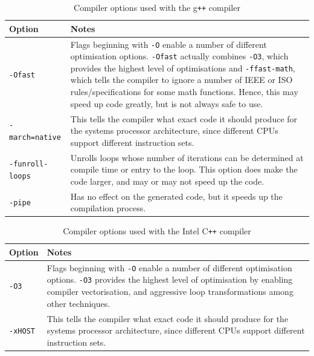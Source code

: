 \documentclass[ %
                    author={Manan Vaswani},
                supervisor={Dr. Raphael Clifford},
                    degree={MEng},
                     title={A multi-core CPU implementation of the classical Boson Sampling algorithm},
                  subtitle={},
                      type={},
                      year={2019} ]{dissertation}
\theoremstyle{plain}
\theoremstyle{definition}
\begin{document}
\begin{table}[h!]
\centering
	\begin{tabular}{ |p{} | p{} |}
    	\hline
	\textbf{Option} & \textbf{Notes} \\
   	\hline
	\texttt{-Ofast} & Flags beginning with \texttt{-O} enable a number of different optimisation options. \texttt{-Ofast} actually combines  \texttt{-O3}, which provides the highest level of optimisations and \texttt{-ffast-math}, which tells the compiler to ignore a number of IEEE or ISO rules/specifications for some math functions. Hence, this may speed up code greatly, but is not always safe to use.\\
	\hline
	\texttt{-march=native} & This tells the compiler what exact code it should produce for the systems processor architecture, since different CPUs support different instruction sets.\\
	\hline
	\texttt{-funroll-loops} & Unrolls loops whose number of iterations can be determined at compile time or entry to the loop. This option does make the code larger, and may or may not speed up the code.\\
	\hline
	\texttt{-pipe} & Has no effect on the generated code, but it speeds up the compilation process.\\
	\hline
	 \end{tabular}
\caption{Compiler options used with the g\texttt{++} compiler} \label{tab:gcc_compiler_flags}
\end{table}

\begin{table}[h!]
\centering
	\begin{tabular}{ |p{} | p{} |}
    	\hline
	\textbf{Option} & \textbf{Notes} \\
   	\hline
	\texttt{-O3} & Flags beginning with \texttt{-O} enable a number of different optimisation options. \texttt{-O3} provides the highest level of optimisation by enabling compiler vectorisation, and aggressive loop transformations among other techniques.\\
	\hline
	\texttt{-xHOST} & This tells the compiler what exact code it should produce for the systems processor architecture, since different CPUs support different instruction sets.\\
	\hline
	 \end{tabular}
\caption{Compiler options used with the Intel C\texttt{++} compiler} \label{tab:intel_compiler_flags}
\end{table}
\end{document}

